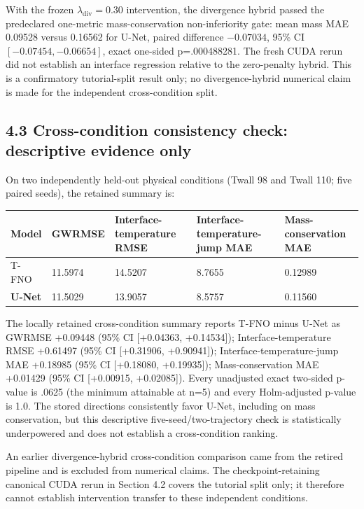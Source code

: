 \documentclass[preprint,12pt]{elsarticle}
\begin{document}
With the frozen \(\lambda_{\mathrm{div}}=0.30\) intervention, the
divergence hybrid passed the predeclared one-metric mass-conservation
non-inferiority gate: mean mass MAE 0.09528 versus 0.16562 for U-Net,
paired difference \(-0.07034\), 95\% CI \([-0.07454, -0.06654]\), exact
one-sided p=.000488281. The fresh CUDA rerun did not establish an
interface regression relative to the zero-penalty hybrid. This is a
confirmatory tutorial-split result only; no divergence-hybrid numerical
claim is made for the independent cross-condition split.

\subsection*{4.3 Cross-condition consistency check: descriptive evidence
only}\label{43-cross-condition-consistency-check-descriptive-evidence-only}

On two independently held-out physical conditions (Twall 98 and Twall
110; five paired seeds), the retained summary is:

{
\begin{longtable}[]{@{}P{0.20\textwidth}P{0.13\textwidth}P{0.18\textwidth}P{0.19\textwidth}P{0.16\textwidth}@{}}
\toprule\noalign{}
Model & GWRMSE & Interface-temperature RMSE & Interface-temperature-jump
MAE & Mass-conservation MAE \\
\midrule\noalign{}
\endhead
\bottomrule\noalign{}
\endlastfoot
T-FNO & 11.5974 & 14.5207 & 8.7655 & 0.12989 \\
\textbf{U-Net} & 11.5029 & 13.9057 & 8.5757 & 0.11560 \\
\end{longtable}
}

The locally retained cross-condition summary reports T-FNO minus U-Net
as GWRMSE +0.09448 (95\% CI {[}+0.04363, +0.14534{]});
Interface-temperature RMSE +0.61497 (95\% CI {[}+0.31906, +0.90941{]});
Interface-temperature-jump MAE +0.18985 (95\% CI {[}+0.18080,
+0.19935{]}); Mass-conservation MAE +0.01429 (95\% CI {[}+0.00915,
+0.02085{]}). Every unadjusted exact two-sided p-value is .0625 (the
minimum attainable at n=5) and every Holm-adjusted p-value is 1.0. The
stored directions consistently favor U-Net, including on mass
conservation, but this descriptive five-seed/two-trajectory check is
statistically underpowered and does not establish a cross-condition
ranking.

An earlier divergence-hybrid cross-condition comparison came from the
retired pipeline and is excluded from numerical claims. The
checkpoint-retaining canonical CUDA rerun in Section 4.2 covers the
tutorial split only; it therefore cannot establish intervention transfer
to these independent conditions.
\end{document}
